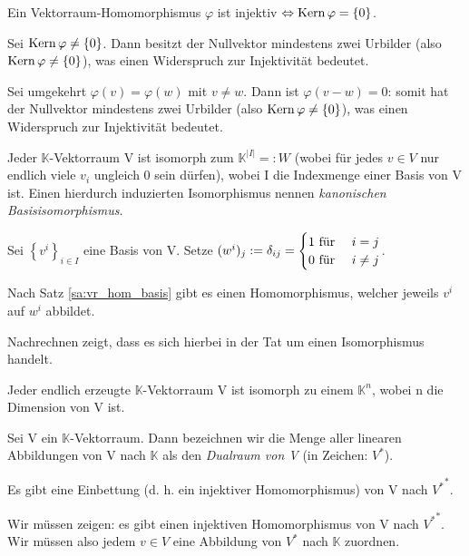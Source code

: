 \documentclass[10pt]{scrbook}
\begin{document}
\begin{Le}
Ein Vektorraum-Homomorphismus $\varphi$ ist injektiv $\Leftrightarrow \operatorname{Kern} \varphi=\left\{0\right\}$. 
\end{Le}
\begin{bew}
Sei $\operatorname{Kern} \varphi\neq\left\{0\right\}$. Dann besitzt der Nullvektor mindestens zwei Urbilder (also $\operatorname{Kern} \varphi\neq\left\{0\right\}$), was einen Widerspruch zur Injektivität bedeutet.

Sei umgekehrt $\varphi(v)=\varphi(w)$ mit $v\neq w$. Dann ist $\varphi(v-w)=0$: somit hat der Nullvektor mindestens zwei Urbilder (also $\operatorname{Kern} \varphi\neq\left\{0\right\}$), was einen Widerspruch zur Injektivität bedeutet.
\end{bew}

\begin{Sa}
Jeder $\mathbb{K}$-Vektorraum V ist isomorph zum $\mathbb{K}^{\left|I\right|}=:W$ (wobei für jedes $v\in V$ nur endlich viele $v_i$ ungleich 0 sein dürfen), wobei I die Indexmenge einer Basis von V ist. Einen hierdurch induzierten Isomorphismus nennen \emph{kanonischen Basisisomorphismus}.
\end{Sa}
\begin{bew}
Sei $\left\{v^i\right\}_{i\in I}$ eine Basis von V. Setze $(w^i)_j:=\delta_{i j}=\begin{cases}
1 \textnormal{ für } & i=j\\
0 \textnormal{ für } & i\neq j\\
\end{cases}$.

Nach Satz \ref{sa:vr_hom_basis} gibt es einen Homomorphismus, welcher jeweils $v^i$ auf $w^i$ abbildet.

Nachrechnen zeigt, dass es sich hierbei in der Tat um einen Isomorphismus handelt.
\end{bew}

\begin{Kor}
Jeder endlich erzeugte $\mathbb{K}$-Vektorraum V ist isomorph zu einem $\mathbb{K}^n$, wobei n die Dimension von V ist.
\end{Kor}

\begin{Def}
Sei V ein $\mathbb{K}$-Vektorraum. Dann bezeichnen wir die Menge aller linearen Abbildungen von V nach $\mathbb{K}$ als den \emph{Dualraum von V} (in Zeichen: $V^*$).
\end{Def}

\begin{Le}
Es gibt eine Einbettung (d. h. ein injektiver Homomorphismus) von V nach ${V^*}^*$.
\end{Le}
\begin{bew}
Wir müssen zeigen: es gibt einen injektiven Homomorphismus von V nach ${V^*}^*$. Wir müssen also jedem $v\in V$ eine Abbildung von $V^*$ nach $\mathbb{K}$ zuordnen.
\end{bew}
\end{document}
